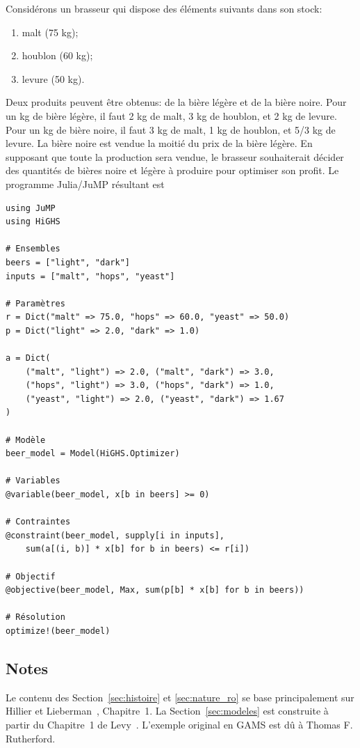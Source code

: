 Considérons un brasseur qui dispose des éléments suivants dans son stock:
\begin{enumerate}
\item
malt (75 kg);
\item
houblon (60 kg);
\item
levure (50 kg).
\end{enumerate}
Deux produits peuvent être obtenus: de la bière légère et de la bière noire.
Pour un kg de bière légère, il faut 2 kg de malt, 3 kg de houblon, et 2 kg de levure.
Pour un kg de bière noire, il faut 3 kg de malt, 1 kg de houblon, et 5/3 kg de levure.
La bière noire est vendue la moitié du prix de la bière légère.
En supposant que toute la production sera vendue, le brasseur souhaiterait décider des quantités de bières noire et légère à produire pour optimiser son profit.
Le programme Julia/JuMP résultant est
\begin{verbatim}
using JuMP
using HiGHS

# Ensembles
beers = ["light", "dark"]
inputs = ["malt", "hops", "yeast"]

# Paramètres
r = Dict("malt" => 75.0, "hops" => 60.0, "yeast" => 50.0)
p = Dict("light" => 2.0, "dark" => 1.0)

a = Dict(
    ("malt", "light") => 2.0, ("malt", "dark") => 3.0,
    ("hops", "light") => 3.0, ("hops", "dark") => 1.0,
    ("yeast", "light") => 2.0, ("yeast", "dark") => 1.67
)

# Modèle
beer_model = Model(HiGHS.Optimizer)

# Variables
@variable(beer_model, x[b in beers] >= 0)

# Contraintes
@constraint(beer_model, supply[i in inputs], 
    sum(a[(i, b)] * x[b] for b in beers) <= r[i])

# Objectif
@objective(beer_model, Max, sum(p[b] * x[b] for b in beers))

# Résolution
optimize!(beer_model)
\end{verbatim}

\begin{small}
\section{Notes}

Le contenu des Section~\ref{sec:histoire} et \ref{sec:nature_ro} se base principalement sur Hillier et Lieberman~\cite{HillLieb01}, Chapitre~1. La Section~\ref{sec:modeles} est construite à partir du Chapitre~1 de Levy~\cite{Levy09}. L'exemple original en GAMS est dû à Thomas F. Rutherford.

\end{small}
